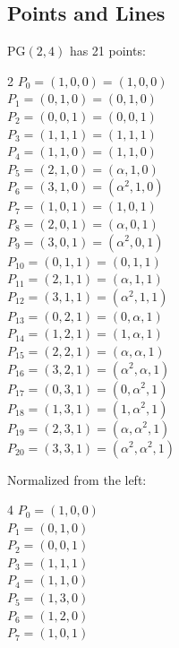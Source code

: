 {\subsection{Points and Lines}
PG$(2, 4)$ has 21 points:\\
\begin{multicols}{2}
$P_{0}=( 1, 0, 0 )=(1, 0, 0)$\\
$P_{1}=( 0, 1, 0 )=(0, 1, 0)$\\
$P_{2}=( 0, 0, 1 )=(0, 0, 1)$\\
$P_{3}=( 1, 1, 1 )=(1, 1, 1)$\\
$P_{4}=( 1, 1, 0 )=(1, 1, 0)$\\
$P_{5}=( 2, 1, 0 )=(\alpha , 1, 0)$\\
$P_{6}=( 3, 1, 0 )=(\alpha^{2}, 1, 0)$\\
$P_{7}=( 1, 0, 1 )=(1, 0, 1)$\\
$P_{8}=( 2, 0, 1 )=(\alpha , 0, 1)$\\
$P_{9}=( 3, 0, 1 )=(\alpha^{2}, 0, 1)$\\
$P_{10}=( 0, 1, 1 )=(0, 1, 1)$\\
$P_{11}=( 2, 1, 1 )=(\alpha , 1, 1)$\\
$P_{12}=( 3, 1, 1 )=(\alpha^{2}, 1, 1)$\\
$P_{13}=( 0, 2, 1 )=(0, \alpha , 1)$\\
$P_{14}=( 1, 2, 1 )=(1, \alpha , 1)$\\
$P_{15}=( 2, 2, 1 )=(\alpha , \alpha , 1)$\\
$P_{16}=( 3, 2, 1 )=(\alpha^{2}, \alpha , 1)$\\
$P_{17}=( 0, 3, 1 )=(0, \alpha^{2}, 1)$\\
$P_{18}=( 1, 3, 1 )=(1, \alpha^{2}, 1)$\\
$P_{19}=( 2, 3, 1 )=(\alpha , \alpha^{2}, 1)$\\
$P_{20}=( 3, 3, 1 )=(\alpha^{2}, \alpha^{2}, 1)$\\
\end{multicols}
Normalized from the left:\\
\begin{multicols}{4}
$P_{0}=( 1, 0, 0 )$\\
$P_{1}=( 0, 1, 0 )$\\
$P_{2}=( 0, 0, 1 )$\\
$P_{3}=( 1, 1, 1 )$\\
$P_{4}=( 1, 1, 0 )$\\
$P_{5}=( 1, 3, 0 )$\\
$P_{6}=( 1, 2, 0 )$\\
$P_{7}=( 1, 0, 1 )$\\

\end{multicols}}
